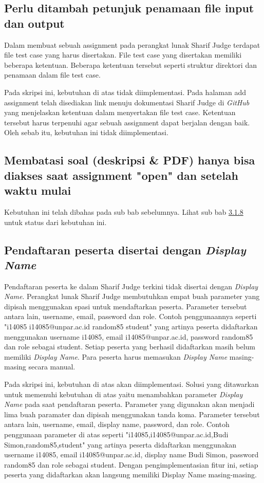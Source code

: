 \subsection{Perlu ditambah petunjuk penamaan file input dan output}
Dalam membuat sebuah assignment pada perangkat lunak Sharif Judge terdapat file test case yang harus disertakan. File test case yang disertakan memiliki beberapa ketentuan. Beberapa ketentuan tersebut seperti struktur direktori dan penamaan dalam file test case. 

Pada skripsi ini, kebutuhan di atas tidak diimplementasi. Pada halaman add assignment telah disediakan link menuju dokumentasi Sharif Judge di \textit{GitHub} yang menjelaskan ketentuan dalam menyertakan file test case. Ketentuan tersebut harus terpenuhi agar sebuah assignment dapat berjalan dengan baik. Oleh sebab itu, kebutuhan ini tidak diimplementasi.

\subsection{Membatasi soal (deskripsi \& PDF) hanya bisa diakses saat assignment "open" dan setelah waktu mulai}
Kebutuhan ini telah dibahas pada sub bab sebelumnya. Lihat sub bab \hyperref[subsec:membatasisoal]{3.1.8} untuk status dari kebutuhan ini.

\subsection{Pendaftaran peserta disertai dengan \textit{Display Name}}
Pendaftaran peserta ke dalam Sharif Judge terkini tidak disertai dengan \textit{Display Name}. Perangkat lunak Sharif Judge membutuhkan empat buah parameter yang dipisah menggunakan spasi untuk mendaftarkan peserta. Parameter tersebut antara lain, username, email, password dan role. Contoh penggunaannya seperti "i14085 i14085@unpar.ac.id random85 student" yang artinya peserta didaftarkan menggunakan username i14085, email i14085@unpar.ac.id, password random85 dan role sebagai student. Setiap peserta yang berhasil didaftarkan masih belum memiliki \textit{Display Name}. Para peserta harus memasukan \textit{Display Name} masing-masing secara manual. 

Pada skripsi ini, kebutuhan di atas akan diimplementasi. Solusi yang ditawarkan untuk memenuhi kebutuhan di atas yaitu menambahkan parameter \textit{Display Name} pada saat pendaftaran peserta. Parameter yang digunakan akan menjadi lima buah paramater dan dipisah menggunakan tanda koma. Parameter tersebut antara lain, username, email, display name, password, dan role. Contoh penggunaan parameter di atas seperti "i14085,i14085@unpar.ac.id,Budi Simon,random85,student" yang artinya peserta didaftarkan menggunakan username i14085, email i14085@unpar.ac.id, display name Budi Simon, password random85 dan role sebagai student. Dengan pengimplementasian fitur ini, setiap peserta yang didaftarkan akan langsung memiliki Display Name masing-masing.

